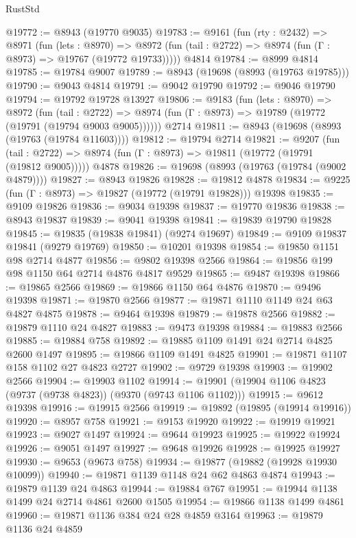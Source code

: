 \begin{lexlean}{RustStd}
\begin{coremodule}
@19772 := @8943 (@19770 @9035)
@19783 := @9161
    (fun (rty : @2432) =>
    @8971
      (fun (lets : @8970) =>
      @8972 (fun (tail : @2722) => @8974 (fun (Γ : @8973) => @19767 (@19772 @19733)))))
    @4814
@19784 := @8999 @4814
@19785 := @19784 @9007
@19789 := @8943 (@19698 (@8993 (@19763 @19785)))
@19790 := @9043 @4814
@19791 := @9042 @19790
@19792 := @9046 @19790
@19794 := @19792 @19728 @13927
@19806 := @9183
    (fun (lets : @8970) =>
    @8972
      (fun (tail : @2722) =>
      @8974 (fun (Γ : @8973) => @19789 (@19772 (@19791 (@19794 @9003 @9005))))))
    @2714
@19811 := @8943 (@19698 (@8993 (@19763 (@19784 @11603))))
@19812 := @19794 @2714
@19821 := @9207
    (fun (tail : @2722) => @8974 (fun (Γ : @8973) => @19811 (@19772 (@19791 (@19812 @9005)))))
    @4878
@19826 := @19698 (@8993 (@19763 (@19784 (@9002 @4879))))
@19827 := @8943 @19826
@19828 := @19812 @4878
@19834 := @9225 (fun (Γ : @8973) => @19827 (@19772 (@19791 @19828))) @19398
@19835 := @9109 @19826
@19836 := @9034 @19398
@19837 := @19770 @19836
@19838 := @8943 @19837
@19839 := @9041 @19398
@19841 := @19839 @19790 @19828
@19845 := @19835 (@19838 @19841) (@9274 @19697)
@19849 := @9109 @19837 @19841 (@9279 @19769)
@19850 := @10201 @19398
@19854 := @19850 @1151 @98 @2714 @4877
@19856 := @9802 @19398 @2566
@19864 := @19856 @199 @98 @1150 @64 @2714 @4876 @4817 @9529
@19865 := @9487 @19398
@19866 := @19865 @2566
@19869 := @19866 @1150 @64 @4876
@19870 := @9496 @19398
@19871 := @19870 @2566
@19877 := @19871 @1110 @1149 @24 @63 @4827 @4875
@19878 := @9464 @19398
@19879 := @19878 @2566
@19882 := @19879 @1110 @24 @4827
@19883 := @9473 @19398
@19884 := @19883 @2566
@19885 := @19884 @758
@19892 := @19885 @1109 @1491 @24 @2714 @4825 @2600 @1497
@19895 := @19866 @1109 @1491 @4825
@19901 := @19871 @1107 @158 @1102 @27 @4823 @2727
@19902 := @9729 @19398
@19903 := @19902 @2566
@19904 := @19903 @1102
@19914 := @19901 (@19904 @1106 @4823 (@9737 (@9738 @4823)) (@9370 (@9743 @1106 @1102)))
@19915 := @9612 @19398
@19916 := @19915 @2566
@19919 := @19892 (@19895 (@19914 @19916))
@19920 := @8957 @758
@19921 := @9153 @19920
@19922 := @19919 @19921
@19923 := @9027 @1497
@19924 := @9644 @19923
@19925 := @19922 @19924
@19926 := @9051 @1497
@19927 := @9648 @19926
@19928 := @19925 @19927
@19930 := @9653 (@9673 @758)
@19934 := @19877 (@19882 (@19928 @19930 @10099))
@19940 := @19871 @1139 @1148 @24 @62 @4863 @4874
@19943 := @19879 @1139 @24 @4863
@19944 := @19884 @767
@19951 := @19944 @1138 @1499 @24 @2714 @4861 @2600 @1505
@19954 := @19866 @1138 @1499 @4861
@19960 := @19871 @1136 @384 @24 @28 @4859 @3164
@19963 := @19879 @1136 @24 @4859

\end{coremodule}
\end{lexlean}
